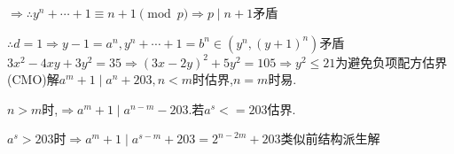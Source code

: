 $ \Rightarrow \therefore y^n +\cdots + 1 \equiv n+1 \pmod p\Rightarrow p \mid n+1 $矛盾

$ \therefore d=1\Rightarrow y-1=a^n,y^n+\cdots+1 =b^n \in (y^n,(y+1)^n)$矛盾
\\

$ 3x^2-4xy+3y^2=35\Rightarrow (3x-2y)^2+5y^2=105\Rightarrow y^2\le 21$为避免负项配方估界
\\

(CMO)解$ a^m+1 \mid a^n+203, n<m$时估界,$ n=m$时易.

$ n>m$时,$ \Rightarrow a^m+1 \mid a^{n-m}-203$.若$ a^s<=203$估界.

$ a^s>203$时$ \Rightarrow a^m+1\mid a^{s-m}+203=2^{n-2m}+203$类似前结构派生解
\\
